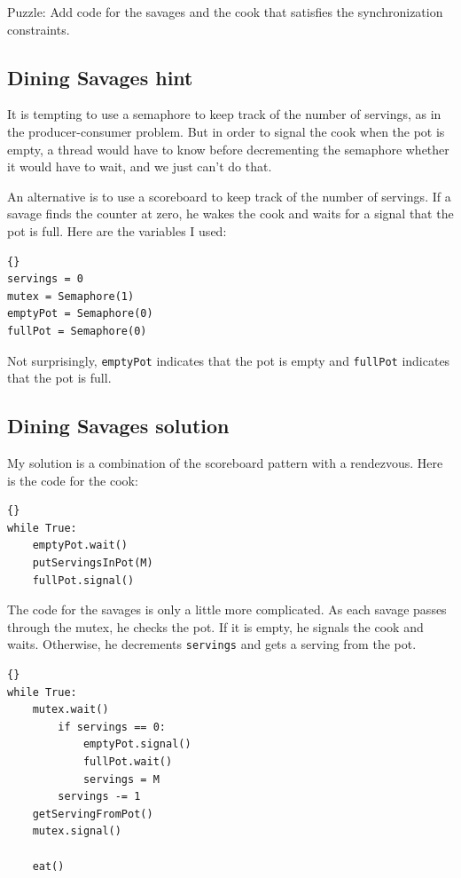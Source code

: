 \documentclass{book}
\newcommand{\clearemptydoublepage}{\newpage\cleardoublepage}
\begin{document}
Puzzle: Add code for the savages and the cook that
satisfies the synchronization constraints.


\clearemptydoublepage
\subsection{Dining Savages hint}

It is tempting to use a semaphore to keep track of the number of
servings, as in the producer-consumer problem.  But in order to signal
the cook when the pot is empty, a thread would have to know before
decrementing the semaphore whether it would have to wait, and we just
can't do that.

An alternative is to use a scoreboard to
keep track of the number of servings.  If a savage finds
the counter at zero, he wakes the cook and waits for a signal
that the pot is full.  Here are the variables I used:

\begin{lstlisting}[title={Dining Savages hint}]{}
servings = 0
mutex = Semaphore(1)
emptyPot = Semaphore(0)
fullPot = Semaphore(0)
\end{lstlisting}

Not surprisingly, {\tt emptyPot} indicates that the pot is empty and
{\tt fullPot} indicates that the pot is full.

\clearemptydoublepage
\subsection{Dining Savages solution}

My solution is a combination of the scoreboard pattern
with a rendezvous.
Here is the code for the cook:

\begin{lstlisting}[title={Dining Savages solution (cook)}]{}
while True:
    emptyPot.wait()
    putServingsInPot(M)
    fullPot.signal()
\end{lstlisting}

The code for the savages is only a little more complicated.
As each savage passes through the mutex, he checks the pot.
If it is empty, he signals the cook and waits.  Otherwise,
he decrements {\tt servings} and gets a serving from the pot.

\begin{lstlisting}[title={Dining Savages solution (savage)}]{}
while True:
    mutex.wait()
        if servings == 0:
            emptyPot.signal()
            fullPot.wait()
            servings = M
        servings -= 1
	getServingFromPot()
    mutex.signal()

    eat()
\end{lstlisting}
\end{document}
